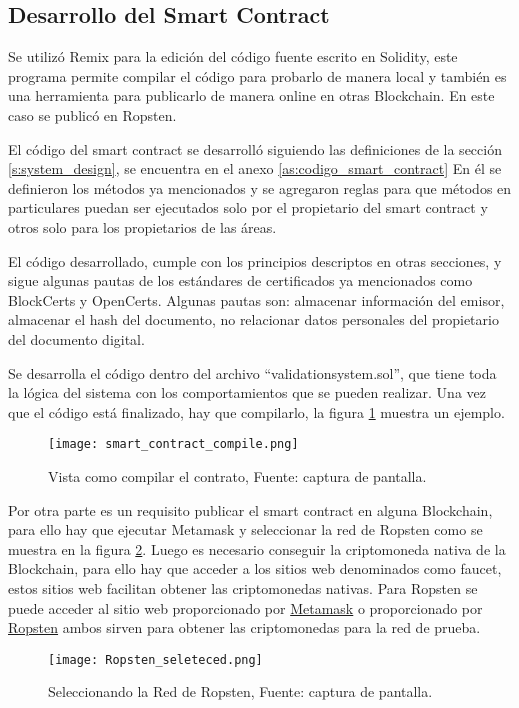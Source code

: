 \subsection{Desarrollo del Smart Contract}
Se utilizó Remix para  la edición del código fuente escrito en Solidity, este programa 
permite compilar el código para probarlo de manera local y también es una herramienta para publicarlo de manera online en otras Blockchain.
En este caso se publicó en Ropsten.

El código del smart contract se desarrolló siguiendo las definiciones de la sección \ref{s:system_design}, se encuentra en el anexo \ref{as:codigo_smart_contract}
En él se definieron los métodos ya mencionados y se agregaron reglas para que métodos en particulares puedan ser ejecutados solo por el propietario del smart contract y otros 
solo para los propietarios de las áreas.

El código desarrollado, cumple con los principios descriptos en otras secciones, 
y sigue algunas pautas de los estándares de certificados ya mencionados como BlockCerts y OpenCerts.
Algunas pautas son: almacenar información del emisor, almacenar el hash del documento, no relacionar datos
personales del propietario del documento digital.

 


Se desarrolla el código dentro del archivo “validationsystem.sol”, que tiene toda la lógica
del sistema con los comportamientos que se pueden realizar.
Una vez que el código está finalizado, hay que compilarlo, la figura   \ref{img:smart_contract_compile} muestra un ejemplo.
\begin{figure}[H]
  \centering
  {\texttt{[image: smart\_contract\_compile.png]}}
  \caption{Vista como compilar el contrato, Fuente: captura de pantalla. }
  \label{img:smart_contract_compile}
\end{figure}


Por otra parte es un requisito publicar el smart contract en alguna Blockchain, para ello hay que ejecutar Metamask y seleccionar la red de Ropsten 
como se muestra en la figura \ref{img:ropsten_selected}.
Luego es necesario conseguir la criptomoneda nativa de la Blockchain, 
para ello hay que acceder  a los sitios web denominados como \gls{faucet}, estos sitios 
web facilitan obtener las criptomonedas nativas. Para Ropsten se puede acceder al sitio web 
proporcionado por \href{https://faucet.metamask.io/}{Metamask}  o 
proporcionado por \href{https://faucet.ropsten.be/}{Ropsten} ambos sirven para obtener las criptomonedas para la red de prueba.  
\begin{figure}[H]
  \centering
  {\texttt{[image: Ropsten\_seleteced.png]}}
  \caption{Seleccionando la Red de Ropsten, Fuente: captura de pantalla. }
  \label{img:ropsten_selected}
\end{figure}

